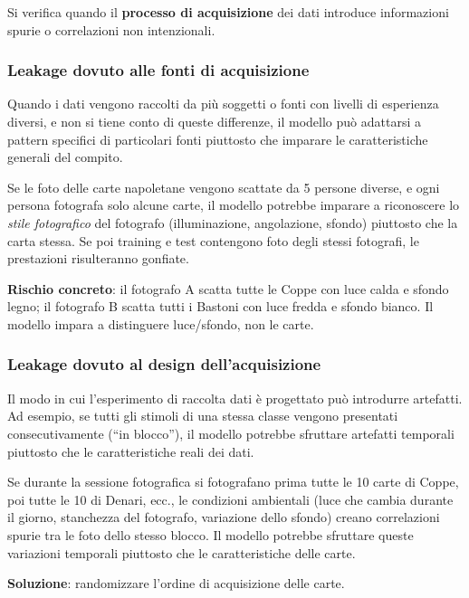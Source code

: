 \documentclass[a4paper,12pt]{article}
\begin{document}
Si verifica quando il \textbf{processo di acquisizione} dei dati introduce informazioni spurie o correlazioni non intenzionali.

\subsubsection{Leakage dovuto alle fonti di acquisizione}

Quando i dati vengono raccolti da più soggetti o fonti con livelli di esperienza diversi, e non si tiene conto di queste differenze, il modello può adattarsi a pattern specifici di particolari fonti piuttosto che imparare le caratteristiche generali del compito.

\begin{esempio}
Se le foto delle carte napoletane vengono scattate da 5 persone diverse, e ogni persona fotografa solo alcune carte, il modello potrebbe imparare a riconoscere lo \emph{stile fotografico} del fotografo (illuminazione, angolazione, sfondo) piuttosto che la carta stessa. Se poi training e test contengono foto degli stessi fotografi, le prestazioni risulteranno gonfiate.

\textbf{Rischio concreto}: il fotografo A scatta tutte le Coppe con luce calda e sfondo legno; il fotografo B scatta tutti i Bastoni con luce fredda e sfondo bianco. Il modello impara a distinguere luce/sfondo, non le carte.
\end{esempio}

\subsubsection{Leakage dovuto al design dell'acquisizione}

Il modo in cui l'esperimento di raccolta dati è progettato può introdurre artefatti. Ad esempio, se tutti gli stimoli di una stessa classe vengono presentati consecutivamente (``in blocco''), il modello potrebbe sfruttare artefatti temporali piuttosto che le caratteristiche reali dei dati.

\begin{esempio}
Se durante la sessione fotografica si fotografano prima tutte le 10 carte di Coppe, poi tutte le 10 di Denari, ecc., le condizioni ambientali (luce che cambia durante il giorno, stanchezza del fotografo, variazione dello sfondo) creano correlazioni spurie tra le foto dello stesso blocco. Il modello potrebbe sfruttare queste variazioni temporali piuttosto che le caratteristiche delle carte.

\textbf{Soluzione}: randomizzare l'ordine di acquisizione delle carte.
\end{esempio}
\end{document}
